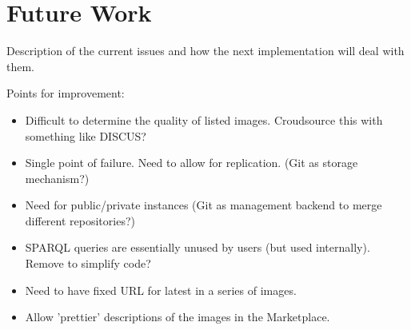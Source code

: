 \section{Future Work}

Description of the current issues and how the next implementation will
deal with them. 

Points for improvement:
\begin{itemize}
\item Difficult to determine the quality of listed images.  Croudsource
  this with something like DISCUS?
\item Single point of failure.  Need to allow for replication.  (Git as
  storage mechanism?)
\item Need for public/private instances (Git as management backend to
  merge different repositories?)
\item SPARQL queries are essentially unused by users (but used
  internally).  Remove to simplify code?
\item Need to have fixed URL for latest in a series of images.
\item Allow 'prettier' descriptions of the images in the Marketplace.
\end{itemize}
